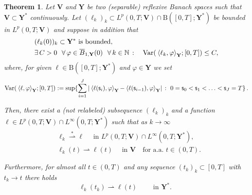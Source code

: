 \documentclass[a4paper,10pt,reqno]{amsart}
\numberwithin{equation}{section}
\newcommand{\N}{\mathbb{N}}
\numberwithin{equation}{section}
\newtheorem{theorem}{Theorem}[section]
\newcommand{\weakto}{\rightharpoonup} %
\newcommand{\weaksto}{\overset{*}{\rightharpoonup}}
\newcommand{\pairing}[4]{ \sideset{_{ #1 }}{_{ #2 }}  {\mathop{\langle #3 , #4
\rangle}}}
\newcommand{\foraa}{\text{for a.a. }}
\newcommand{\bsV}{\mathbf{V}}
\newcommand{\bsY}{\mathbf{Y}}
\begin{document}
\begin{theorem}
\label{th:mie-theil}
Let $\bsV$ and $\bsY$ be two (separable) reflexive Banach spaces  such that
$\bsV \subset \bsY^*$ continuously. Let
 $(\ell_k)_k \subset L^p
(0,T;\bsV) \cap \mathrm{B} ([0,T];\bsY^*)$ be  bounded  in $L^p
(0,T;\bsV) $ and suppose in addition  that
\begin{align}
\label{ell-n-0}
&
\text{$(\ell_k(0))_k\subset \bsY^*$ is bounded},
\\
&
\label{BV-bound}
\exists\, C>0 \  \ \forall\, \varphi \in \overline{B}_{1,\bsY}(0)  \ \  \forall\, k \in \N\, : \quad
 \mathrm{Var}(\pairing{}{\bsY}{\ell_k}{ \varphi}; [0,T] )  \leq C,
\end{align}
where, for  given $\ell \in
\mathrm{B}([0,T];\bsY^*)$ and $\varphi \in \bsY$ we set
\begin{equation}
\label{var-notation}
\begin{aligned}
\mathrm{Var}(\pairing{}{\bsY}{\ell}{ \varphi}; [0,T] ) : =  \sup \{  \sum_{i=1}^J
\left |\pairing{}{\bsY}{\ell(\mathsf{s}_{i})}{ \varphi} - \pairing{}{\bsY}{\ell(\mathsf{s}_{i-1})}{ \varphi}  \right|
\, :  \
0 =\mathsf{s}_0 < \mathsf{s}_1 < \ldots < \mathsf{s}_J =T \} \,.
\end{aligned}
\end{equation}
\par
Then, there exist  a  (not relabeled) subsequence
 $(\ell_{k})_k$
 and a function $\ell \in L^p (0,T;\bsV) \cap L^\infty (0,T; \bsY^*) $ %
 such that  as $k\to \infty$
 \begin{align}
 \label{weak-LpB}
 &
 \ell_{k} \weaksto \ell \quad \text{ in } L^p (0,T;\bsV) \cap L^\infty (0,T;\bsY^*),
 \\
\label{weak-ptw-B}
&
\ell_{k}(t) \weakto \ell(t) \quad \text{ in } \bsV\quad \foraa t \in (0,T).
\end{align}
\par
Furthermore, for almost all $t \in (0,T)$ and any sequence $(t_k)_k \subset [0,T]$ with $t_k \to t$ there holds 
\begin{equation}
\label{enhSav}
 \ell_{k}(t_k) \weakto \ell(t)  \qquad \text{ in $\bsY^*$. }
 \end{equation}
\end{theorem}
\end{document}
